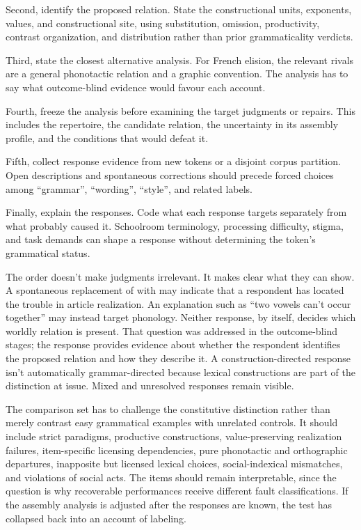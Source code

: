 \documentclass[12pt,letterpaper]{article}
\begin{document}
Second, identify the proposed relation. State the constructional units, exponents, values, and
constructional site, using substitution, omission, productivity, contrast
organization, and distribution rather than prior grammaticality verdicts.

Third, state the closest alternative analysis. For French elision, the relevant
rivals are a general phonotactic relation and a graphic convention. The analysis
has to say what outcome-blind evidence would favour each account.

Fourth, freeze the analysis before examining the target judgments or repairs.
This includes the repertoire, the candidate relation, the uncertainty in its
assembly profile, and the conditions that would defeat it.

Fifth, collect response evidence from new tokens or a disjoint corpus partition.
Open descriptions and spontaneous corrections should precede forced choices
among \enquote{grammar}, \enquote{wording}, \enquote{style}, and related labels.

Finally, explain the responses. Code what each response targets separately from
what probably caused it. Schoolroom terminology, processing difficulty, stigma,
and task demands can shape a response without determining the token's grammatical
status.

The order doesn't make judgments irrelevant. It makes clear what they can show.
A spontaneous replacement of  with  may indicate that a
respondent has located the trouble in article realization. An explanation such as
\enquote{two vowels can't occur together} may instead target phonology. Neither
response, by itself, decides which worldly relation is present. That question was
addressed in the outcome-blind stages; the response provides evidence about
whether the respondent identifies the proposed relation and how they describe it.
A construction-directed response
isn't automatically grammar-directed because lexical constructions are part of
the distinction at issue. Mixed and unresolved responses remain visible.

The comparison set has to challenge the constitutive distinction rather than
merely contrast easy grammatical examples with unrelated controls. It should
include strict paradigms, productive constructions, value-preserving realization
failures, item-specific licensing dependencies, pure phonotactic and orthographic
departures, inapposite but licensed lexical choices, social-indexical mismatches, and
violations of social acts. The items should remain interpretable, since the
question is why recoverable performances receive different fault
classifications. If the assembly analysis is adjusted after the responses are
known, the test has collapsed back into an account of labeling.
\end{document}
